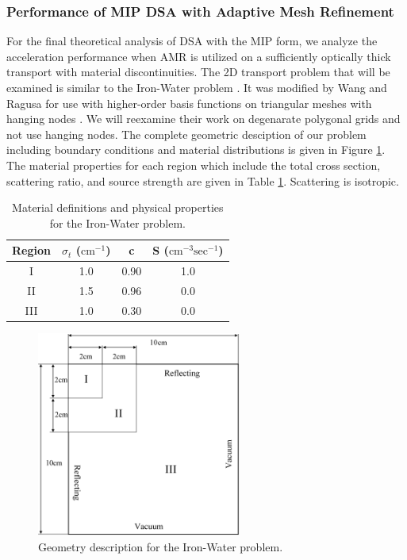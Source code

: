 \subsubsection{Performance of MIP DSA with Adaptive Mesh Refinement}
\label{sec::DSA_Results_1G_AMR}

For the final theoretical analysis of DSA with the MIP form, we analyze the acceleration performance when AMR is utilized on a sufficiently optically thick transport with material discontinuities. The 2D transport problem that will be examined is similar to the Iron-Water problem \cite{khalil1985nodal}. It was modified by Wang and Ragusa for use with higher-order basis functions on triangular meshes with hanging nodes \cite{ref::DSA_wang_ragusa}. We will reexamine their work on degenarate polygonal grids and not use hanging nodes. The complete geometric desciption of our problem including boundary conditions and material distributions is given in Figure \ref{fig::DSA_IW_Description}. The material properties for each region which include the total cross section, scattering ratio, and source strength are given in Table \ref{tab::DSA_IW_mats}. Scattering is isotropic. 



\begin{table}
\caption{Material definitions and physical properties for the Iron-Water problem.}
\centering
\def\arraystretch{1.2}
\begin{tabular}{|c|c|c|c|}
\hline
Region & $\sigma_t$ ($\text{cm}^{-1}$) & c  & S ($\text{cm}^{-3} \text{sec}^{-1}$) \\
\hline
I & 1.0 & 0.90 & 1.0 \\
\hline
II & 1.5 & 0.96 & 0.0 \\
\hline
III & 1.0 & 0.30 & 0.0\\
\hline
\end{tabular}
\label{tab::DSA_IW_mats}
\end{table}

\begin{figure}
\centering
\includegraphics[width=0.60\textwidth]{figures/sec_DSA/IW_Description.png}
\caption{Geometry description for the Iron-Water problem.}
\label{fig::DSA_IW_Description}
\end{figure}

